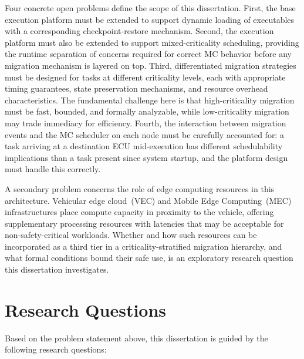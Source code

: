 Four concrete open problems define the scope of this dissertation. First, the base
execution platform must be extended to support dynamic loading of executables with a corresponding checkpoint-restore mechanism. Second, the execution platform must also be extended to support mixed-criticality scheduling, providing
the runtime separation of concerns required for correct MC behavior before any migration
mechanism is layered on top. Third, differentiated migration strategies must be
designed for tasks at different criticality levels, each with appropriate timing
guarantees, state preservation mechanisms, and resource overhead characteristics.
The fundamental challenge here is that high-criticality migration must be fast,
bounded, and formally analyzable, while low-criticality migration may trade immediacy
for efficiency. Fourth, the interaction between migration events and the MC scheduler
on each node must be carefully accounted for: a task arriving at a destination ECU
mid-execution has different schedulability implications than a task present since
system startup, and the platform design must handle this correctly.

A secondary problem concerns the role of edge computing resources in this architecture.
Vehicular edge cloud~(VEC) and Mobile Edge Computing~(MEC) infrastructures place
compute capacity in proximity to the vehicle, offering supplementary processing
resources with latencies that may be acceptable for non-safety-critical workloads.
Whether and how such resources can be incorporated as a third tier in a
criticality-stratified migration hierarchy, and what formal conditions bound their
safe use, is an exploratory research question this dissertation investigates.

\section{Research Questions}
\label{sec:researchquestions}

Based on the problem statement above, this dissertation is guided by the following
research questions:

